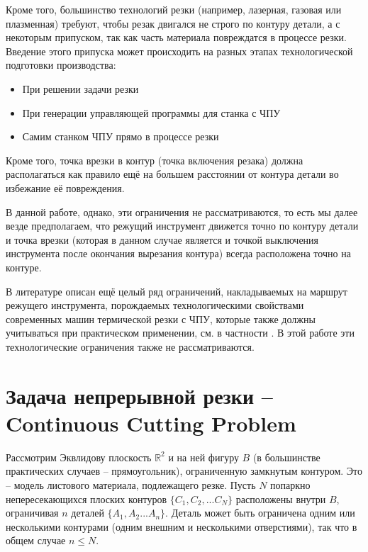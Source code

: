 \documentclass[14pt]{extarticle}
\theoremstyle{plain}%
\theoremstyle{remark}
\begin{document}
Кроме того,
большинство технологий резки
(например, лазерная, газовая или плазменная)
требуют,
чтобы резак двигался не строго по контуру детали,
а с некоторым припуском,
так как часть материала повреждатся в процессе резки.
Введение этого припуска может происходить
на разных этапах технологической подготовки производства:
\begin{itemize}
  \item
  При решении задачи резки
  \item
  При генерации управляющей программы для станка с ЧПУ
  \item
  Самим станком ЧПУ прямо в процессе резки
\end{itemize}

Кроме того,
точка врезки в контур
(точка включения резака)
должна располагаться
как правило ещё на большем расстоянии
от контура детали
во избежание её повреждения.

В данной работе,
однако,
эти ограничения не рассматриваются,
то есть
мы далее везде предполагаем,
что режущий инструмент движется точно по контуру детали
и точка врезки
(которая в данном случае
является и точкой выключения инструмента
после окончания вырезания контура)
всегда расположена точно на контуре.

В литературе описан
ещё целый ряд ограничений,
накладываемых на маршрут режущего инструмента,
порождаемых
технологическими свойствами
современных машин термической резки с ЧПУ,
которые также должны учитываться
при практическом применении,
см. в частности
\cite{Sozopol,Miskolc}.
В этой работе
эти технологические ограничения также не рассматриваются.


\section{Задача непрерывной резки -- Continuous Cutting Problem}

Рассмотрим Эквлидову плоскость
$\mathbb R ^ 2$
и на ней фигуру
$B$
(в большинстве практических случаев -- прямоугольник),
ограниченную замкнутым контуром.
Это -- модель листового материала,
подлежащего резке.
Пусть
$N$
попаркно непересекающихся плоских контуров
$\{C_1, C_2, ... C_N\}$
расположены внутри
$B$,
ограничивая
$n$
деталей
$\{A_1, A_2 ... A_n\}$.
Деталь может быть ограничена
одним или несколькими контурами
(одним внешним и несколькими отверстиями),
так что в общем случае
$n \leqslant N$.
\end{document}
